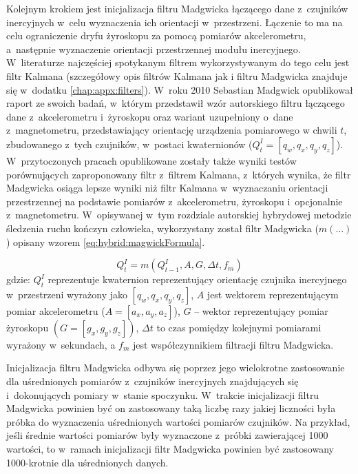 Kolejnym krokiem jest inicjalizacja filtru Madgwicka łączącego dane z~czujników inercyjnych w~celu wyznaczenia ich orientacji w~przestrzeni. Łączenie to ma na celu ograniczenie dryfu żyroskopu za pomocą pomiarów akcelerometru, a~następnie wyznaczenie orientacji przestrzennej modułu inercyjnego. W~literaturze najczęściej spotykanym filtrem wykorzystywanym do tego celu jest filtr Kalmana \cite{Sasiadek2000, Sabatini2011, Mau2005, Qingming2014} (szczegółowy opis filtrów Kalmana jak i filtru Madgwicka znajduje się w~dodatku \ref{chap:appx:filters}). W~roku 2010 Sebastian Madgwick opublikował raport ze swoich badań, w~którym przedstawił wzór autorskiego filtru łączącego dane z~akcelerometru i~żyroskopu oraz wariant uzupełniony o~dane z~magnetometru,  przedstawiający orientację urządzenia pomiarowego w chwili $t$, zbudowanego z~tych czujników, w~postaci kwaternionów \cite{Madgwick2010, Madgwick2011} ($Q_t^I = \left[q_w, q_x, q_y, q_z\right]$). W~przytoczonych pracach opublikowane zostały także wyniki testów porównujących zaproponowany filtr z~filtrem Kalmana, z~których wynika, że filtr Madgwicka osiąga lepsze wyniki niż filtr Kalmana w~wyznaczaniu orientacji przestrzennej na podstawie pomiarów z~akcelerometru, żyroskopu i~opcjonalnie z~magnetometru. W~opisywanej w~tym rozdziale autorskiej hybrydowej metodzie śledzenia ruchu kończyn człowieka, wykorzystany został filtr Madgwicka ($m(\ldots)$) opisany wzorem \ref{eq:hybrid:magwickFormula}. 
		
\begin{equation}
	Q^I_t = m(Q^I_{t-1}, A, G, \Delta t, f_m) 
	\label{eq:hybrid:magwickFormula}
\end{equation}
gdzie: $Q^I_t$ reprezentuje kwaternion reprezentujący orientację czujnika inercyjnego w~przestrzeni wyrażony jako $\left[q_w, q_x, q_y, q_z\right]$, $A$ jest wektorem reprezentującym pomiar akcelerometru ($A =\left[a_x, a_y, a_z\right]$), $G$ -- wektor reprezentujący pomiar żyroskopu $(G = \left[g_x, g_y, g_z\right])$,	$\Delta t$ to czas pomiędzy kolejnymi pomiarami wyrażony w~sekundach, a	$f_m$ jest współczynnikiem filtracji filtru Madgwicka.
		
Inicjalizacja filtru Madgwicka odbywa się poprzez jego wielokrotne zastosowanie dla uśrednionych pomiarów z~czujników inercyjnych znajdujących się i~dokonujących pomiary w~stanie spoczynku. W~trakcie inicjalizacji filtru Madgwicka powinien być on zastosowany taką liczbę razy jakiej liczności była próbka do wyznaczenia uśrednionych wartości pomiarów czujników. Na przykład, jeśli średnie wartości pomiarów były wyznaczone z~próbki zawierającej 1000 wartości, to w~ramach inicjalizacji filtr Madgwicka powinien być zastosowany 1000-krotnie dla uśrednionych danych.\\
		
